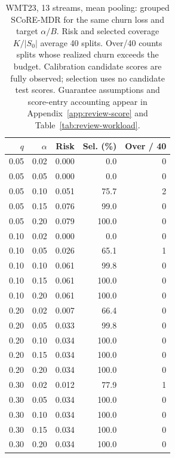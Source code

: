 \begin{table}[t]
\centering\small
\begin{tabular}{rrrrr}
\toprule
$q$ & $\alpha$ & Risk & Sel. (\%) & Over / 40 \\
\midrule
0.05 & 0.02 & 0.000 & 0.0 & 0 \\
0.05 & 0.05 & 0.000 & 0.0 & 0 \\
0.05 & 0.10 & 0.051 & 75.7 & 2 \\
0.05 & 0.15 & 0.076 & 99.0 & 0 \\
0.05 & 0.20 & 0.079 & 100.0 & 0 \\
0.10 & 0.02 & 0.000 & 0.0 & 0 \\
0.10 & 0.05 & 0.026 & 65.1 & 1 \\
0.10 & 0.10 & 0.061 & 99.8 & 0 \\
0.10 & 0.15 & 0.061 & 100.0 & 0 \\
0.10 & 0.20 & 0.061 & 100.0 & 0 \\
0.20 & 0.02 & 0.007 & 66.4 & 0 \\
0.20 & 0.05 & 0.033 & 99.8 & 0 \\
0.20 & 0.10 & 0.034 & 100.0 & 0 \\
0.20 & 0.15 & 0.034 & 100.0 & 0 \\
0.20 & 0.20 & 0.034 & 100.0 & 0 \\
0.30 & 0.02 & 0.012 & 77.9 & 1 \\
0.30 & 0.05 & 0.034 & 100.0 & 0 \\
0.30 & 0.10 & 0.034 & 100.0 & 0 \\
0.30 & 0.15 & 0.034 & 100.0 & 0 \\
0.30 & 0.20 & 0.034 & 100.0 & 0 \\
\bottomrule
\end{tabular}
\caption{WMT23, 13 streams, mean pooling: grouped SCoRE-MDR for the same churn loss and target $\alpha/B$. Risk and selected coverage $K/|S_0|$ average 40 splits. Over/40 counts splits whose realized churn exceeds the budget. Calibration candidate scores are fully observed; selection uses no candidate test scores. Guarantee assumptions and score-entry accounting appear in Appendix~\ref{app:review-score} and Table~\ref{tab:review-workload}.}
\label{tab:review-score-1-mean}
\end{table}
